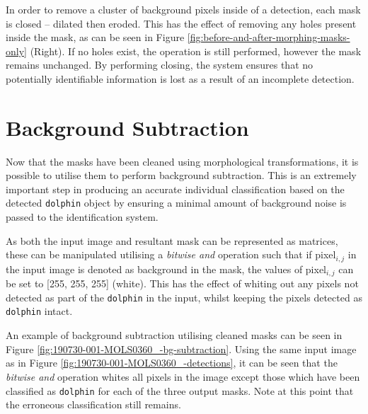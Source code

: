 In order to remove a cluster of background pixels inside of a detection, each mask is closed -- dilated then eroded. This has the effect of removing any holes present inside the mask, as can be seen in Figure \ref{fig:before-and-after-morphing-masks-only} (Right). If no holes exist, the operation is still performed, however the mask remains unchanged. By performing closing, the system ensures that no potentially identifiable information is lost as a result of an incomplete detection. 

\section{Background Subtraction}\label{ch:postProcessing,sec:bgExtraction}

Now that the masks have been cleaned using morphological transformations, it is possible to utilise them to perform background subtraction. This is an extremely important step in producing an accurate individual classification based on the detected \texttt{dolphin} object by ensuring a minimal amount of background noise is passed to the identification system.

As both the input image and resultant mask can be represented as matrices, these can be manipulated utilising a \textit{bitwise and} operation such that if pixel$_{i, j}$ in the input image is denoted as background in the mask, the values of pixel$_{i, j}$ can be set to [255, 255, 255] (white). This has the effect of whiting out any pixels not detected as part of the \texttt{dolphin} in the input, whilst keeping the pixels detected as \texttt{dolphin} intact.

An example of background subtraction utilising cleaned masks can be seen in Figure \ref{fig:190730-001-MOLS0360_-bg-subtraction}. Using the same input image as in Figure \ref{fig:190730-001-MOLS0360_-detections}, it can be seen that the \textit{bitwise and} operation whites all pixels in the image except those which have been classified as \texttt{dolphin} for each of the three output masks. Note at this point that the erroneous classification still remains. 

